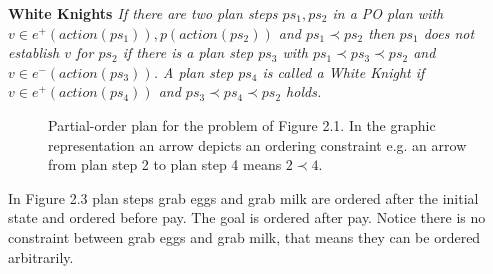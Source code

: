 \begin{Definition}
  \normalfont \textbf{White Knights \cite{Kambhampti}}
  \textit{
    If there are two plan steps $ps_1, ps_2$ in a PO plan with $v \in e^+(action(ps_1)),p(action(ps_2))$ and $ps_1 \prec ps_2$ 
    then $ps_1$ does not establish $v$ for $ps_2$ if there is a plan step $ps_3$ with $ps_1 \prec ps_3 \prec ps_2$ and $v \in e^-(action(ps_3))$.
    A plan step $ps_4$ is called a White Knight if $v \in e^+(action(ps_4))$ and $ps_3 \prec ps_4 \prec ps_2$ holds. 
  }
\end{Definition}

\begin{figure}[h]

  \caption{Partial-order plan for the problem of Figure 2.1.\newline
    In the graphic representation an arrow depicts an ordering constraint e.g. an arrow from plan step 2 to plan step 4 means
    $2\prec 4$.
 }

\end{figure}
In Figure 2.3 plan steps grab eggs and grab milk are ordered after the initial state and ordered before pay.
The goal is ordered after pay. Notice there is no constraint between grab eggs and grab milk, that means they can 
be ordered arbitrarily. 



